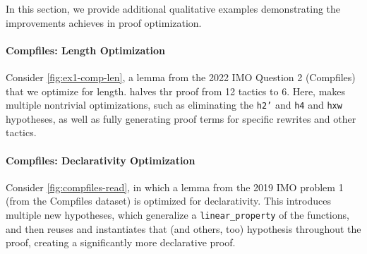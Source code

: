 \label{app:qual_improver}


In this section, we provide additional qualitative examples demonstrating the improvements \methodname{} achieves in proof optimization.

\vspace{15px}
\paragraph{Compfiles: Length Optimization} 

Consider \autoref{fig:ex1-comp-len},  a lemma from the 2022 IMO Question 2 (Compfiles) that we optimize for length. \methodname{} halves thr proof from 12 tactics to 6. Here, \methodname{} makes multiple nontrivial optimizations, such as eliminating the \texttt{h2'} and \texttt{h4} and \texttt{hxw} hypotheses, as well as fully generating proof terms for specific rewrites and other tactics.
\vspace{15px}
\paragraph{Compfiles: Declarativity Optimization} 



Consider \autoref{fig:compfiles-read}, in which a lemma from the 2019 IMO problem 1 (from the Compfiles dataset) is optimized for declarativity. This introduces multiple new hypotheses, which generalize a \texttt{linear\_property} of the functions, and then reuses and instantiates that (and others, too) hypothesis throughout the proof, creating a significantly more declarative proof.


